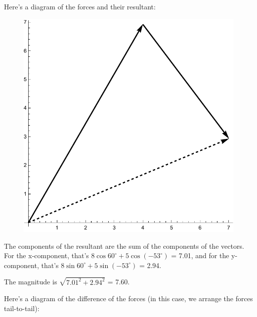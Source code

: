 \documentclass{amsart}
\begin{document}
Here's a diagram of the forces and their resultant:

\begin{figure}[h]
\includegraphics[scale=0.4]{2-7}
\end{figure}

The components of the resultant are the sum of the components of the vectors.
For the x-component, that's $8 \cos 60^\circ + 5 \cos (-53^\circ)$ = 7.01,
and for the y-component, that's $8 \sin 60^\circ + 5 \sin (-53^\circ)$ = 2.94.

The magnitude is $\sqrt{7.01^2 + 2.94^2}$ = 7.60.

\clearpage

Here's a diagram of the difference of the forces (in this case, we arrange the forces tail-to-tail):
\end{document}
